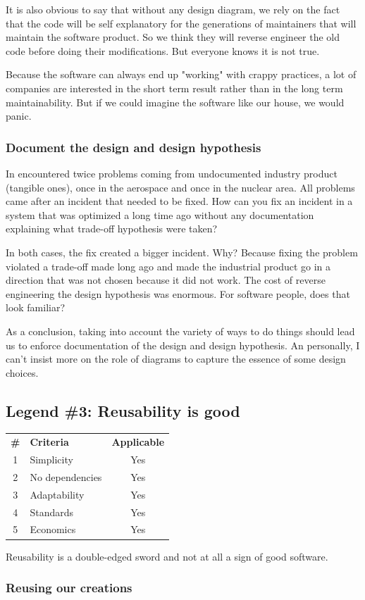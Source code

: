 \documentclass[]{article}
\newcommand{\criterias}[5]
{\begin{center}
\rowcolors{2}{gray!25}{white}
{\small\begin{tabular}{clc}
\rowcolor{gray!50}
\textbf{\#} & \textbf{Criteria} & \textbf{Applicable} \\
1 & Simplicity      & #1 \\
2 & No dependencies & #2 \\
3 & Adaptability    & #3 \\
4 & Standards       & #4 \\
5 & Economics       & #5 \\
\end{tabular}}
\end{center}}
\begin{document}
It is also obvious to say that without any design diagram, we rely on the fact that the code will be self explanatory for the generations of maintainers that will maintain the software product. So we think they will reverse engineer the old code before doing their modifications. But everyone knows it is not true.

Because the software can always end up "working" with crappy practices, a lot of companies are interested in the short term result rather than in the long term maintainability. But if we could imagine the software like our house, we would panic.

\subsubsection{Document the design and design hypothesis}

In encountered twice problems coming from undocumented industry product (tangible ones), once in the aerospace and once in the nuclear area. All problems came after an incident that needed to be fixed. How can you fix an incident in a system that was optimized a long time ago without any documentation explaining what trade-off hypothesis were taken?

In both cases, the fix created a bigger incident. Why? Because fixing the problem violated a trade-off made long ago and made the industrial product go in a direction that was not chosen because it did not work. The cost of reverse engineering the design hypothesis was enormous. For software people, does that look familiar?

As a conclusion, taking into account the variety of ways to do things should lead us to enforce documentation of the design and design hypothesis. An personally, I can't insist more on the role of diagrams to capture the essence of some design choices.

\subsection{Legend \#3: Reusability is good}

\criterias{Yes}{Yes}{Yes}{Yes}{Yes}

Reusability is a double-edged sword and not at all a sign of good software.

\subsubsection{Reusing our creations}
\end{document}
